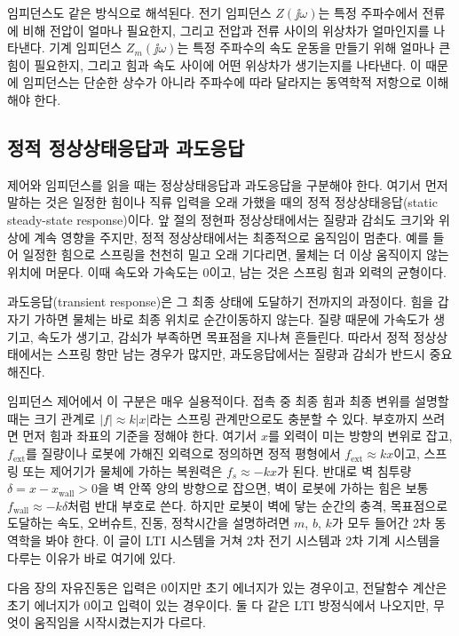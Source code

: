 임피던스도 같은 방식으로 해석된다.
전기 임피던스 $Z(\jj\omega)$는 특정 주파수에서 전류에 비해 전압이 얼마나 필요한지, 그리고 전압과 전류 사이의 위상차가 얼마인지를 나타낸다.
기계 임피던스 $Z_m(\jj\omega)$는 특정 주파수의 속도 운동을 만들기 위해 얼마나 큰 힘이 필요한지, 그리고 힘과 속도 사이에 어떤 위상차가 생기는지를 나타낸다.
이 때문에 임피던스는 단순한 상수가 아니라 주파수에 따라 달라지는 동역학적 저항으로 이해해야 한다.

\subsection{정적 정상상태응답과 과도응답}

제어와 임피던스를 읽을 때는 정상상태응답과 과도응답을 구분해야 한다.
여기서 먼저 말하는 것은 일정한 힘이나 직류 입력을 오래 가했을 때의 정적 정상상태응답(static steady-state response)이다.
앞 절의 정현파 정상상태에서는 질량과 감쇠도 크기와 위상에 계속 영향을 주지만, 정적 정상상태에서는 최종적으로 움직임이 멈춘다.
예를 들어 일정한 힘으로 스프링을 천천히 밀고 오래 기다리면, 물체는 더 이상 움직이지 않는 위치에 머문다.
이때 속도와 가속도는 0이고, 남는 것은 스프링 힘과 외력의 균형이다.

과도응답(transient response)은 그 최종 상태에 도달하기 전까지의 과정이다.
힘을 갑자기 가하면 물체는 바로 최종 위치로 순간이동하지 않는다.
질량 때문에 가속도가 생기고, 속도가 생기고, 감쇠가 부족하면 목표점을 지나쳐 흔들린다.
따라서 정적 정상상태에서는 스프링 항만 남는 경우가 많지만, 과도응답에서는 질량과 감쇠가 반드시 중요해진다.

임피던스 제어에서 이 구분은 매우 실용적이다.
접촉 중 최종 힘과 최종 변위를 설명할 때는 크기 관계로 $|f|\approx k|x|$라는 스프링 관계만으로도 충분할 수 있다.
부호까지 쓰려면 먼저 힘과 좌표의 기준을 정해야 한다.
여기서 $x$를 외력이 미는 방향의 변위로 잡고, $f_{\mathrm{ext}}$를 질량이나 로봇에 가해진 외력으로 정의하면 정적 평형에서 $f_{\mathrm{ext}}\approx kx$이고, 스프링 또는 제어기가 물체에 가하는 복원력은 $f_s\approx-kx$가 된다.
반대로 벽 침투량 $\delta=x-x_{\mathrm{wall}}>0$을 벽 안쪽 양의 방향으로 잡으면, 벽이 로봇에 가하는 힘은 보통 $f_{\mathrm{wall}}\approx-k\delta$처럼 반대 부호로 쓴다.
하지만 로봇이 벽에 닿는 순간의 충격, 목표점으로 도달하는 속도, 오버슈트, 진동, 정착시간을 설명하려면 $m$, $b$, $k$가 모두 들어간 2차 동역학을 봐야 한다.
이 글이 LTI 시스템을 거쳐 2차 전기 시스템과 2차 기계 시스템을 다루는 이유가 바로 여기에 있다.

다음 장의 자유진동은 입력은 0이지만 초기 에너지가 있는 경우이고, 전달함수 계산은 초기 에너지가 0이고 입력이 있는 경우이다.
둘 다 같은 LTI 방정식에서 나오지만, 무엇이 움직임을 시작시켰는지가 다르다.

